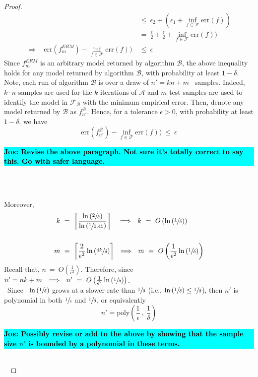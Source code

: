 \documentclass[twoside,11pt]{homework}
\DeclarePairedDelimiter{\2norm}{\lVert}{\rVert^2_2}
\newcommand{\1}[1]{\mathds{1}\left[#1\right]}
\newcommand{\joe}[1]{\textcolor{black}{\colorbox{cyan}{\parbox{15.5cm}{\textbf{\textsc{Joe}:  #1}}}}}
\begin{document}
\begin{proof}
\begin{align*}
& \leq \ \epsilon_2 + (\epsilon_1 + \inf_{f \in \mathcal{F}}\text{err}(f)) \\[0.5em]
& = \ \frac{\epsilon}{2} + \frac{\epsilon}{2} + \inf_{f \in \mathcal{F}}\text{err}(f)) \\[0.5em]
\Longrightarrow \ \ \ \ \text{err}(f_m^{ERM}) - \inf_{f \in \mathcal{F}}\text{err}(f)) \ &\leq \ \epsilon
\end{align*}
Since $f_m^{ERM}$ is an arbitrary model returned by algorithm $\mathcal{B}$, the above inequality holds for any model returned by algorithm $\mathcal{B}$, with probability at least $1 - \delta$. Note, each run of algorithm $\mathcal{B}$ is over a draw of $n' = kn + m$ \ samples. Indeed, $k \cdot n$ samples are used for the $k$ iterations of $\mathcal{A}$ and $m$ test samples are used to identify the model in $\mathcal{F}_{\mathcal{B}}$ with the minimum empirical error. Then, denote any model returned by $\mathcal{B}$ as $f_{n'}^{\mathcal{B}}$.  Hence, for a tolerance $\epsilon > 0$, with probability at least $1-\delta$, we have
$$\text{err}(f_{n'}^{\mathcal{B}}) - \inf_{f \in \mathcal{F}}\text{err}(f)) \ \leq \ \epsilon$$
\joe{Revise the above paragraph. Not sure it's totally correct to say this. Go with safer language.}\\\

\noindent
Moreover, 
\begin{align*}
k \ &= \ \left\lceil\frac{\ln\left(\sfrac{2}{\delta}\right)}{\ln\left(\sfrac{1}{0.45}\right)}\right\rceil \ \ \ \Longrightarrow \ \ k \ = \ O\left(\ln\left(\sfrac{1}{\delta}\right)\right)\\[1.5em]
m \ &= \ \left\lceil\frac{2}{\epsilon^2}\ln\left(\sfrac{4k}{\delta}\right)\right\rceil \ \ \Longrightarrow \ \ m \ = \ O\left(\frac{1}{\epsilon^2}\ln\left(\sfrac{1}{\delta}\right)\right)
\end{align*}
Recall that, $n \ = \ O\left(\frac{1}{\epsilon^2}\right)$. Therefore, since \ $n' = nk + m \ \ \Longrightarrow \ \ n' \ = \ O\left(\frac{1}{\epsilon^2}\ln\left(\sfrac{1}{\delta}\right)\right)$.\\\
Since \ $\ln\left(\sfrac{1}{\delta}\right)$ grows at a slower rate than $\sfrac{1}{\delta}$ (i.e., $\ln\left(\sfrac{1}{\delta}\right) \leq \sfrac{1}{\delta}$), then $n'$ is polynomial in both $\sfrac{1}{\epsilon}$ and $\sfrac{1}{\delta}$, or equivalently
$$n' = \text{poly}\left(\frac{1}{\epsilon} \ , \ \frac{1}{\delta}\right)$$
\joe{Possibly revise or add to the above by showing that the sample size $n'$ is bounded by a polynomial in these terms.}\\\


\end{proof}
\end{document}
